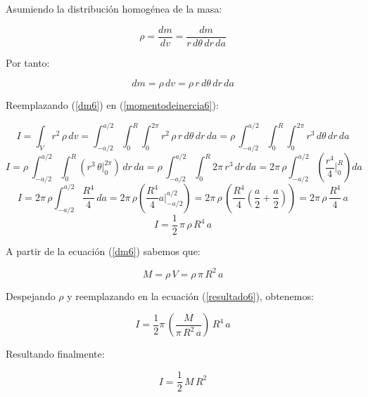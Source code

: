 \documentclass[letter,11pt]{article}
\begin{document}
Asumiendo la distribución homogénea de la masa:

\begin{equation*}
    \rho = \frac{dm}{dv} = \frac{dm}{r\, d\theta\, dr\, da}
\end{equation*}

Por tanto:

\begin{equation}
    dm = \rho\, dv = \rho\, r\, d\theta\, dr\, da
\label{dm6}
\end{equation}

Reemplazando (\ref{dm6}) en (\ref{momentodeinercia6}):

\begin{equation*}
    I = \int_{V} r^2\, \rho\, dv = \int_{-a/2}^{a/2} \int_{0}^{R} \int_{0}^{2\pi} r^2\, \rho\, r\, d\theta\, dr\, da = \rho\, \int_{-a/2}^{a/2} \int_{0}^{R} \int_{0}^{2\pi} r^3\, d\theta\, dr\, da
\end{equation*}
\begin{equation*}
    I = \rho\, \int_{-a/2}^{a/2} \int_{0}^{R} (r^3\, \theta \Biggr|_{0}^{2\pi})\, dr\, da = \rho\, \int_{-a/2}^{a/2} \int_{0}^{R} 2\pi\, r^3\, dr\, da = 2\pi\, \rho \int_{-a/2}^{a/2} \left(\frac{r^4}{4}\Biggr|_{0}^{R}\right) da
\end{equation*}
\begin{equation*}
    I = 2\pi\, \rho \int_{-a/2}^{a/2} \frac{R^4}{4}\, da = 2\pi\, \rho \left(\frac{R^4}{4} a\Biggr|_{-a/2}^{a/2}\right) = 2\pi\, \rho\, \left( \frac{R^4}{4} \left( \frac{a}{2} + \frac{a}{2} \right)  \right) = 2\pi\, \rho\, \frac{R^4}{4}\, a
\end{equation*}
\begin{equation}
    I = \frac{1}{2}\, \pi\, \rho\, R^4\, a
\label{resultado6}
\end{equation}

A partir de la ecuación (\ref{dm6}) sabemos que:

\begin{equation*}
    M = \rho\, V = \rho\, \pi\, R^2\, a
\end{equation*}

Despejando $\rho$ y reemplazando en la ecuación (\ref{resultado6}), obtenemos:

\begin{equation*}
    I = \frac{1}{2} \pi\, (\frac{M}{\pi\, R^2\, a})\, R^4\, a
\end{equation*}

Resultando finalmente:

\begin{equation}
    I = \frac{1}{2}\, M\, R^2
\end{equation}
\end{document}
